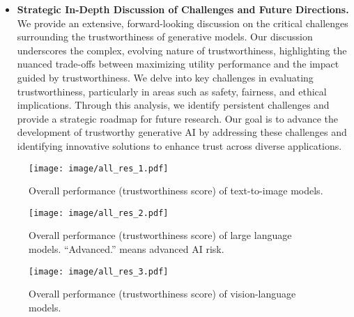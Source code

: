 \begin{itemize}[nolistsep, leftmargin=*]
    \item \textbf{Strategic In-Depth Discussion of Challenges and Future Directions.} We provide an extensive, forward-looking discussion on the critical challenges surrounding the trustworthiness of generative models. Our discussion underscores the complex, evolving nature of trustworthiness, highlighting the nuanced trade-offs between maximizing utility performance and the impact guided by trustworthiness. We delve into key challenges in evaluating trustworthiness, particularly in areas such as safety, fairness, and ethical implications. Through this analysis, we identify persistent challenges and provide a strategic roadmap for future research. Our goal is to advance the development of trustworthy generative AI by addressing these challenges and identifying innovative solutions to enhance trust across diverse applications.
\end{itemize}


\begin{figure}[h]
    \centering
    \texttt{[image: image/all\_res\_1.pdf]}
    \caption{Overall performance (trustworthiness score) of text-to-image models.}
    \label{fig:overall_t2i}
    \vspace{-5pt}
\end{figure}

\begin{figure}[h]
    \centering
    \texttt{[image: image/all\_res\_2.pdf]}
    \caption{Overall performance (trustworthiness score) of large language models. ``Advanced.'' means advanced AI risk.}
    \label{fig:overall_llm}
\end{figure}


\begin{figure}[h]
    \centering
    \texttt{[image: image/all\_res\_3.pdf]}
    \caption{Overall performance (trustworthiness score) of vision-language models.}
    \label{fig:overall_vlm}
    \vspace{-10pt}
\end{figure}







